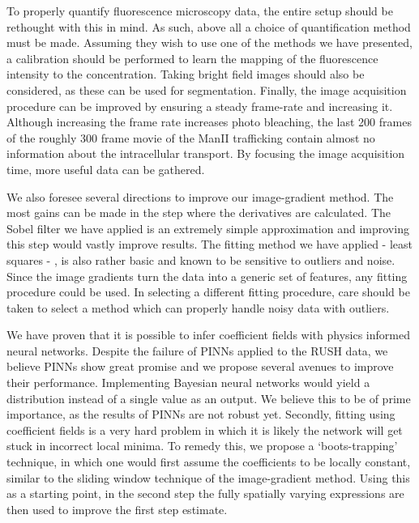 \documentclass{Dissertate}
\begin{document}
To properly quantify fluorescence microscopy data, the entire setup should be rethought with this in mind. As such, above all a choice of quantification method must be made. Assuming they wish to use one of the methods we have presented, a calibration should be performed to learn the mapping of the fluorescence intensity to the concentration. Taking bright field images should also be considered, as these can be used for segmentation. Finally, the image acquisition procedure can be improved by ensuring a steady frame-rate and increasing it. Although increasing the frame rate increases photo
bleaching, the last 200 frames of the roughly 300 frame movie of the ManII trafficking contain almost no information about the intracellular transport. By focusing the image acquisition time, more useful data can be gathered.

We also foresee several directions to improve our image-gradient method. The
most gains can be made in the step where the derivatives are calculated.
The Sobel filter we have applied is an extremely simple approximation and improving this step would vastly improve results. The fitting method we have applied - least squares - , is also rather basic and known to be sensitive to outliers and noise. Since the image gradients turn the data into a generic set of features, any fitting procedure could be used. In selecting a different fitting procedure, care should be taken to select a method which can properly handle noisy data with outliers.

We have proven that it is possible to infer coefficient
fields with physics informed neural networks. Despite the failure of PINNs applied to the RUSH data, we believe PINNs show great promise and we propose several avenues to improve their performance. Implementing Bayesian neural networks would yield a distribution instead of a single value as an output. We believe this to be of prime importance, as the results of PINNs are not robust yet. Secondly, fitting using coefficient fields is a very hard problem in which it is likely the network will get stuck in incorrect local minima. To remedy this, we propose a `boots-trapping' technique,
in which one would first assume the coefficients to be locally constant,
similar to the sliding window technique of the image-gradient method.
Using this as a starting point, in the second step the fully spatially
varying expressions are then used to improve the first step estimate. 
\end{document}

